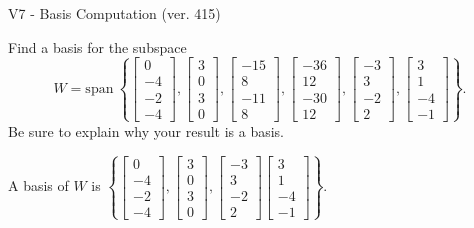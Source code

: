 \begin{exercise}
  \begin{exerciseTitle}V7 - Basis Computation (ver. 415)\end{exerciseTitle}
  \begin{exerciseStatement}
    Find a basis for the subspace 
\[W=\mathrm{span}\ \left\{\left[\begin{array}{r}
0 \\
-4 \\
-2 \\
-4
\end{array}\right] , \left[\begin{array}{r}
3 \\
0 \\
3 \\
0
\end{array}\right] , \left[\begin{array}{r}
-15 \\
8 \\
-11 \\
8
\end{array}\right] , \left[\begin{array}{r}
-36 \\
12 \\
-30 \\
12
\end{array}\right] , \left[\begin{array}{r}
-3 \\
3 \\
-2 \\
2
\end{array}\right] , \left[\begin{array}{r}
3 \\
1 \\
-4 \\
-1
\end{array}\right]\right\}.\]
 Be sure to explain why your result is a basis.


  \end{exerciseStatement}
  \begin{exerciseAnswer}
   A basis of \(W\) is  \(\left\{\left[\begin{array}{r}
0 \\
-4 \\
-2 \\
-4
\end{array}\right] , \left[\begin{array}{r}
3 \\
0 \\
3 \\
0
\end{array}\right] , \left[\begin{array}{r}
-3 \\
3 \\
-2 \\
2
\end{array}\right] \left[\begin{array}{r}
3 \\
1 \\
-4 \\
-1
\end{array}\right]\right\}\).
  


  \end{exerciseAnswer}
\end{exercise}